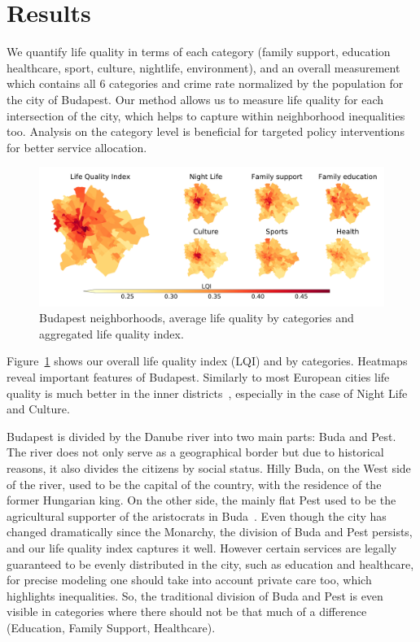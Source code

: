 \section{Results}
We quantify life quality in terms of each category (family support, education healthcare, sport, culture, nightlife, environment), and an overall measurement which contains all 6 categories and crime rate normalized by the population for the city of Budapest. Our method allows us to measure life quality for each intersection of the city, which helps to capture within neighborhood inequalities too. Analysis on the category level is beneficial for targeted policy interventions for better service allocation.

\begin{figure}[htbp]
	\centering
	\includegraphics[width=\textwidth]{images/lqi/Budapest_LQI_Neighborhoods-eps-converted-to.pdf}
	\caption[Budapest neighborhoods life quality index]{Budapest neighborhoods, average life quality by categories and aggregated life quality index.}
	\label{fig:BPlqi}
\end{figure}

Figure~\ref{fig:BPlqi} shows our overall life quality index (LQI) and by categories. Heatmaps reveal important features of Budapest. Similarly to most European cities life quality is much better in the inner districts~\cite{Hohenberg1996Urban,Brueckner1999Central}, especially in the case of Night Life and Culture.

Budapest is divided by the Danube river into two main parts: Buda and Pest. The river does not only serve as a geographical border but due to historical reasons, it also divides the citizens by social status. Hilly Buda, on the West side of the river, used to be the capital of the country, with the residence of the former Hungarian king. On the other side, the mainly flat Pest used to be the agricultural supporter of the aristocrats in Buda~\cite{Kover2006Magyarorszag}. Even though the city has changed dramatically since the Monarchy, the division of Buda and Pest persists, and our life quality index captures it well. However certain services are legally guaranteed to be evenly distributed in the city, such as education and healthcare, for precise modeling one should take into account private care too, which highlights inequalities. So, the traditional division of Buda and Pest is even visible in categories where there should not be that much of a difference (Education, Family Support, Healthcare).


